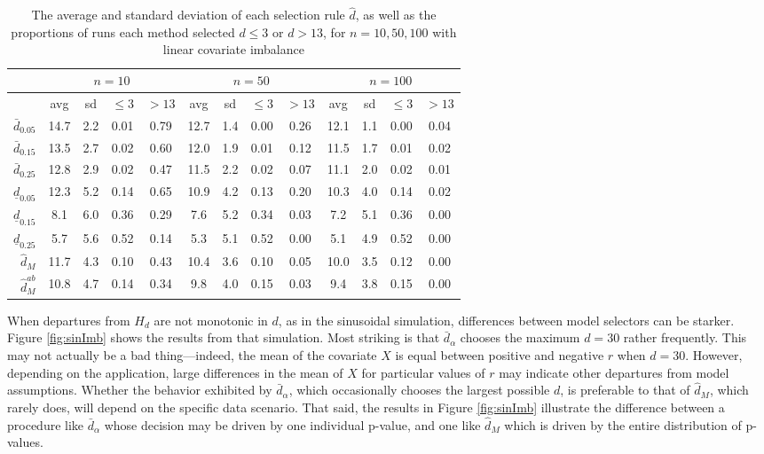 \documentclass[sts]{imsart}\usepackage[]{graphicx}\usepackage[]{color}
\newcommand{\dalphaU}{\bar{d}_\alpha}
\newcommand{\dhatU}{\bar{d}}
\newcommand{\dhatB}{\underline{d}}
\newcommand{\dhatm}{\hat{d}_M}
\newcommand{\dhatmab}{\hat{d}^{ab}_M}
\begin{document}
\begin{table}[ht]
\centering
\begin{tabular}{r|cccc|cccc|cccc|}
  & \multicolumn{4}{c}{$n=10$}&\multicolumn{4}{c}{$n=50$} &\multicolumn{4}{c}{$n=100$}\\
 \hline
 & avg & sd & $\le 3$ & $>13$ & avg & sd & $\le 3$ & $>13$ & avg & sd & $\le 3$ & $>13$ \\ 
  \hline
$\dhatU_{0.05}$ & 14.7 & 2.2 & 0.01 & 0.79 & 12.7 & 1.4 & 0.00 & 0.26 & 12.1 & 1.1 & 0.00 & 0.04 \\ 
  $\dhatU_{0.15}$ & 13.5 & 2.7 & 0.02 & 0.60 & 12.0 & 1.9 & 0.01 & 0.12 & 11.5 & 1.7 & 0.01 & 0.02 \\ 
  $\dhatU_{0.25}$ & 12.8 & 2.9 & 0.02 & 0.47 & 11.5 & 2.2 & 0.02 & 0.07 & 11.1 & 2.0 & 0.02 & 0.01 \\ 
  $\dhatB_{0.05}$ & 12.3 & 5.2 & 0.14 & 0.65 & 10.9 & 4.2 & 0.13 & 0.20 & 10.3 & 4.0 & 0.14 & 0.02 \\ 
  $\dhatB_{0.15}$ & 8.1 & 6.0 & 0.36 & 0.29 & 7.6 & 5.2 & 0.34 & 0.03 & 7.2 & 5.1 & 0.36 & 0.00 \\ 
  $\dhatB_{0.25}$ & 5.7 & 5.6 & 0.52 & 0.14 & 5.3 & 5.1 & 0.52 & 0.00 & 5.1 & 4.9 & 0.52 & 0.00 \\ 
  $\dhatm$ & 11.7 & 4.3 & 0.10 & 0.43 & 10.4 & 3.6 & 0.10 & 0.05 & 10.0 & 3.5 & 0.12 & 0.00 \\ 
  $\dhatmab$ & 10.8 & 4.7 & 0.14 & 0.34 & 9.8 & 4.0 & 0.15 & 0.03 & 9.4 & 3.8 & 0.15 & 0.00 \\ 
   \hline
\end{tabular}
\caption{The average and standard deviation of each selection rule $\hat{d}$, as well as the proportions of runs each method selected $d\le 3$ or $d>13$, for $n=10,50,100$ with linear covariate imbalance} 
\label{tab:linear}
\end{table}


When departures from $H_d$ are not monotonic in $d$, as in the
sinusoidal simulation, differences between model selectors can be
starker.
Figure \ref{fig:sinImb} shows the results from that simulation.
Most striking is that $\dalphaU$ chooses the maximum $d=30$ rather
frequently.
This may not actually be a bad thing---indeed, the mean of the
covariate $X$ is equal between positive and negative $r$ when $d=30$.
However, depending on the application, large differences in the mean
of $X$ for particular values of $r$ may indicate other departures from
model assumptions.
Whether the behavior exhibited by $\dalphaU$, which occasionally
chooses the largest possible $d$, is preferable to that of $\dhatm$,
which rarely does, will depend on the specific data scenario.
That said, the results in Figure \ref{fig:sinImb} illustrate the
difference between a procedure like $\dalphaU$ whose decision may be driven by one
individual p-value, and one like $\dhatm$ which is driven by the
entire distribution of p-values.
\end{document}
